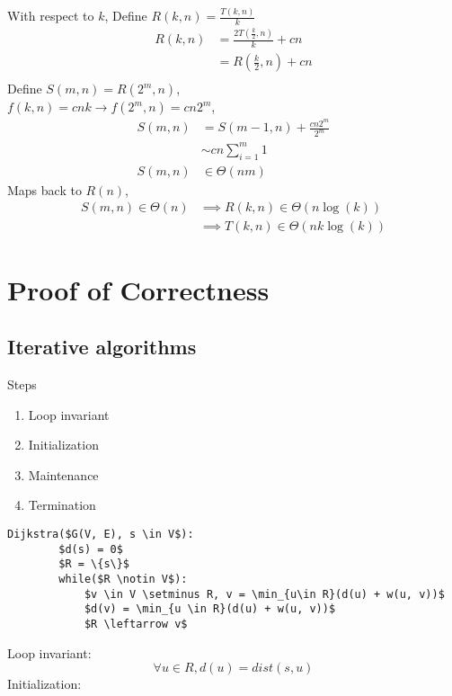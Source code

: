 \documentclass{article}
\begin{document}
With respect to $k$, Define $R(k, n) = \frac{T(k, n)}{k}$
\begin{align*}
    R(k, n) &= \frac{2 T(\frac{k}{2}, n)}{k} + cn\\
    &= R(\frac{k}{2}, n) + cn\\
\end{align*}
Define $S(m, n) = R(2^m, n)$,\\
$f(k, n) = cnk \rightarrow f(2^m, n) = cn2^m$, 
\begin{align*}
    S(m, n) &= S(m - 1, n) + \frac{cn2^m}{2^m}\\
    & \sim cn\sum_{i=1}^{m} 1\\
    S(m, n) &\in \Theta(nm)
\end{align*}
Maps back to $R(n)$,
\begin{align*}
    S(m, n) \in \Theta(n) &\implies R(k, n) \in \Theta(n\log(k))\\
    &\implies T(k, n) \in \Theta(nk\log(k))
\end{align*}




\section{Proof of Correctness}
\subsection*{Iterative algorithms}
Steps
\begin{enumerate}
    \item Loop invariant
    \item Initialization
    \item Maintenance
    \item Termination
\end{enumerate}
\begin{lstlisting}[mathescape=true]
    Dijkstra($G(V, E), s \in V$):
        $d(s) = 0$
        $R = \{s\}$
        while($R \notin V$):
            $v \in V \setminus R, v = \min_{u\in R}(d(u) + w(u, v))$
            $d(v) = \min_{u \in R}(d(u) + w(u, v))$
            $R \leftarrow v$
\end{lstlisting}
Loop invariant: 
\[\forall u \in R, d(u) = dist(s, u)\]
Initialization:
\end{document}
